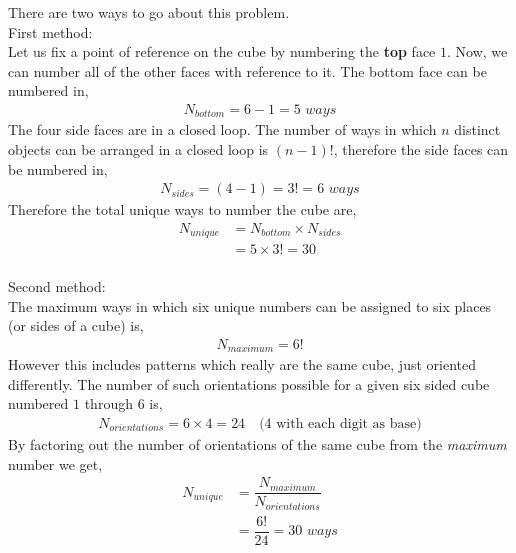 \fi 

\begin{solution}[\halfpage]
  There are two ways to go about this problem.\\
  First method:\\
  Let us fix a point of reference on the cube by numbering the \textbf{top}
  face $1$. Now, we can number all of the other faces with reference to it.
  The bottom face can be numbered in,
  \begin{align}
     N_{bottom} = 6 - 1 = 5 \textit{ ways}
  \end{align}
  The four side faces are in a closed loop. The number of ways in which
  $n$ distinct objects can be arranged in a closed loop is $(n-1)!$, 
  therefore the side faces can be numbered in,
  \begin{align}
     N_{sides} = (4 - 1) = 3! = 6 \textit{ ways}
  \end{align}
  Therefore the total unique ways to number the cube are,
  \begin{align}
    N_{unique} &= N_{bottom} \times N_{sides} \\
               &= 5 \times 3! = 30 
  \end{align}
  \\
  Second method:\\
  The maximum ways in which six unique numbers can be assigned to six
  places (or sides of a cube) is,
  \begin{align}
    N_{maximum} = 6! 
  \end{align}
  However this includes patterns which really are the same cube, just
  oriented differently. The number of such orientations possible for 
  a given six sided cube numbered $1$ through $6$ is,
  \begin{align}
  N_{orientations} = 6 \times 4 = 24 \quad\text{(4 with each digit as base)}
  \end{align}
  By factoring out the number of orientations of the same cube from the 
  \textit{maximum} number we get,
  \begin{align}
    N_{unique} &= \dfrac{N_{maximum}}{N_{orientations}} \\
               &= \dfrac{6!}{24} = 30 \textit{ ways}
  \end{align}   
\end{solution}

